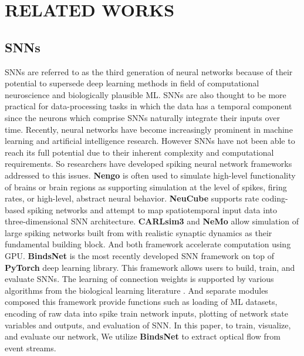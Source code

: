 \section{RELATED WORKS}



\subsection{\ac{SNNs}}

\ac{SNNs} \cite{maass1996lower,maass1997networks} are referred to as the third generation of neural networks because of their potential to supersede deep learning methods in field of computational neuroscience and biologically plausible \ac{ML}. \ac{SNNs} are also thought to be more practical for data-processing tasks in which the data has a temporal component since the neurons which comprise \ac{SNNs} naturally integrate their inputs over time. Recently, neural networks have become  increasingly prominent in machine learning and artificial intelligence research. However \ac{SNNs} have not been able to reach its full potential due to their inherent complexity and computational requirements. So researchers have developed spiking neural network frameworks addressed to this issues. \textbf{Nengo} \cite{bekolay2014nengo} is often used to simulate high-level functionality of brains or brain regions as supporting simulation at the level of spikes, firing rates, or high-level, abstract neural behavior. \textbf{NeuCube} \cite{kasabov2014neucube} supports rate coding-based spiking networks and attempt to map spatiotemporal input data into three-dimensional \acs{SNN} architecture. \textbf{CARLsim3} \cite{beyeler2015carlsim} and \textbf{NeMo} \cite{fidjeland2009nemo} allow simulation of large spiking networks built from \cite{izhikevich2003simple} with realistic synaptic dynamics as their fundamental building block. And both framework accelerate computation using \ac{GPU}. \textbf{BindsNet} \cite{hazan2018bindsnet} is the most recently developed \acs{SNN} framework on top of \textbf{PyTorch} deep learning library. This framework allows users to build, train, and evaluate \ac{SNNs}. The learning of connection weights is supported by various algorithms from the biological learning literature \cite{markram1997regulation}. And separate modules composed this framework provide functions such as loading of ML datasets, encoding of raw data into spike train network inputs, plotting of network state variables and outputs, and evaluation of \acs{SNN}. In this paper, to train, visualize, and evaluate our network, We utilize \textbf{BindsNet} to extract optical flow from event streams.

